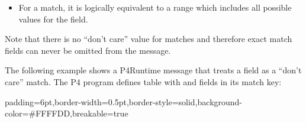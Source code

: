 \documentclass[11pt]{article}
\begin{document}
{\begin{itemize}
\item{}
For a  match, it is logically equivalent to a range which includes all
possible values for the field.%
\end{itemize}%

\noindent{}Note that there is no \textquotedblleft{}don't care\textquotedblright{} value for  matches and therefore exact
match fields can never be omitted from the  message.%

The following example shows a P4Runtime message that treats a  field
as a \textquotedblleft{}don't care\textquotedblright{} match. The P4 program defines table  with 
and  fields in its match key:%

\begin{mdbmargintb}{6pt}{6pt}%
\begin{mdblock}{padding=6pt,border-width=0.5pt,border-style=solid,background-color=\#FFFFDD,breakable=true}%
\begin{mdpre}%
\end{mdpre}%
\end{mdblock}%
\end{mdbmargintb}%

}
\end{document}
